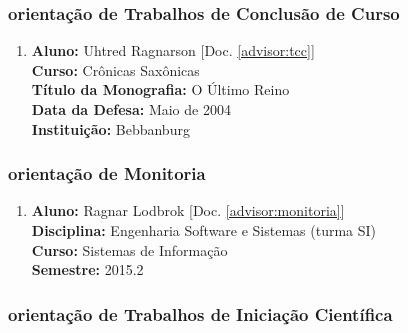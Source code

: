\documentclass[a4paper,oneside,12pt]{article}
\begin{document}

\subsubsection{orientação de Trabalhos de Conclusão de Curso}
\vspace{0.3cm}

\begin{enumerate}
\renewcommand{\labelenumi}{{\large\bfseries\arabic{enumi}.}}

\item       \textbf{Aluno:} Uhtred Ragnarson [Doc. \ref{advisor:tcc}]\\
            \textbf{Curso:} Crônicas Saxônicas\\
            \textbf{Título da Monografia:} O Último Reino\\
            \textbf{Data da Defesa:} Maio de 2004\\
            \textbf{Instituição:} Bebbanburg

\end{enumerate}


\subsubsection{orientação de Monitoria}
\vspace{0.3cm}

\begin{enumerate}
\renewcommand{\labelenumi}{{\large\bfseries\arabic{enumi}.}}

\item   \textbf{Aluno:} Ragnar Lodbrok [Doc. \ref{advisor:monitoria}]\\
        \textbf{Disciplina:}  Engenharia Software e Sistemas (turma SI)\\
        \textbf{Curso:} Sistemas de Informação\\
        \textbf{Semestre:} 2015.2

\end{enumerate}


\subsubsection{orientação de Trabalhos de Iniciação Científica}
\vspace{0.3cm}
\end{document}
